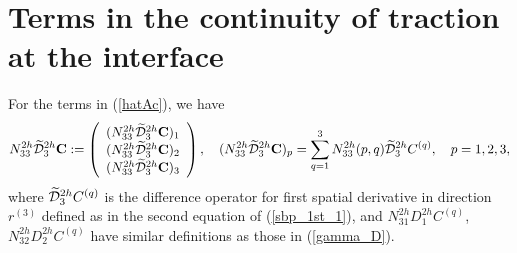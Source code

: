 \section{Terms in the continuity of traction at the interface}\label{traction_c}
For the terms in (\ref{hatAc}), we have
\begin{align*}
{N}_{33}^{2h}\widetilde{\mathcal{D}}_3^{2h}{\bf C} := \left(\begin{array}{c}
({N}_{33}^{2h}\widetilde{\mathcal{D}}_3^{2h}{\bf C})_1 \\
({N}_{33}^{2h}\widetilde{\mathcal{D}}_3^{2h}{\bf C})_2 \\
({N}_{33}^{2h}\widetilde{\mathcal{D}}_3^{2h}{\bf C})_3 
\end{array}\right), \quad ({N}_{33}^{2h}\widetilde{\mathcal{D}}_3^{2h}{\bf C})_p = \sum_{q = 1}^{3} N_{33}^{2h}(p,q)\widetilde{\mathcal{D}}_3^{2h}{C}^{(q)},\quad p = 1,2,3,
\end{align*}
where $\widetilde{\mathcal{D}}_3^{2h}{C}^{(q)}$ is the difference operator for first spatial derivative in direction $r^{(3)}$ defined as in the second equation of (\ref{sbp_1st_1}), and $N_{31}^{2h}{D}_1^{2h}{C}^{(q)}$, $N_{32}^{2h}{D}_2^{2h}{C}^{(q)}$ have similar definitions as those in (\ref{gamma_D}). 